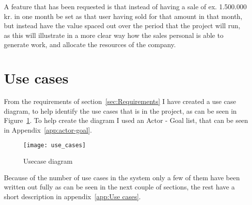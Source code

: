 A feature that has been requested is that instead of having a sale of ex. 1.500.000 kr. in one month be set as that user having sold for that amount in that month, but instead have the value spaced out over the period that the project will run, as this will illustrate in a more clear way how the sales personal is able to generate work, and allocate the resources of the company.

\section{Use cases}
\label{sec:Use cases}
From the requirements of section~\ref{sec:Requirements} I have created a use case diagram, to help identify the use cases that is in the project, as can be seen in Figure~\ref{fig:usecase_diagram}. To help create the diagram I used an Actor - Goal list, that can be seen in Appendix~\ref{app:actor-goal}.

\begin{figure}[h]
  \centering
  \texttt{[image: use\_cases]}
  \caption{Usecase diagram}
  \label{fig:usecase_diagram}
\end{figure}

Because of the number of use cases in the system only a few of them have been written out fully as can be seen in the next couple of sections, the rest have a short description in appendix~\ref{app:Use cases}.

